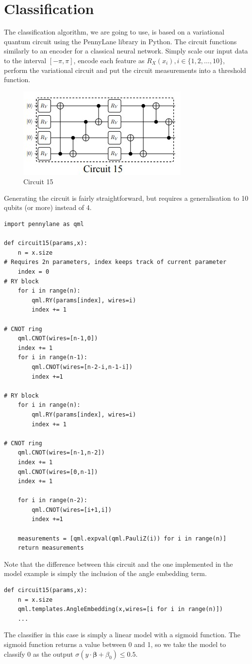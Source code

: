 \documentclass{article}
\theoremstyle{definition}
\begin{document}
\section{Classification}
The classification algorithm, we are going to use, is based on a variational quantum circuit using the PennyLane library \cite{bergholm2020pennylane} in Python. The circuit functions similarly to an encoder for a classical neural network. Simply scale our input data to the interval $[-\pi, \pi]$, encode each feature as $R_X(x_i), i \in \{1, 2, \ldots, 10\}$, perform the variational circuit and put the circuit measurements into a threshold function.

\begin{figure}[htb]
    \centering
    \includegraphics{Circuit15.jpg}
    \caption{Circuit 15 \cite{Sim_2019}}
    \label{fig:circuit15}
\end{figure}
Generating the circuit is fairly straightforward, but requires a generalisation to 10 qubits (or more) instead of 4.

\begin{verbatim}
import pennylane as qml

def circuit15(params,x):
    n = x.size
# Requires 2n parameters, index keeps track of current parameter
    index = 0
# RY block
    for i in range(n):
        qml.RY(params[index], wires=i)
        index += 1

# CNOT ring
    qml.CNOT(wires=[n-1,0])
    index += 1
    for i in range(n-1):
        qml.CNOT(wires=[n-2-i,n-1-i])
        index +=1        

# RY block
    for i in range(n):
        qml.RY(params[index], wires=i)
        index += 1
        
# CNOT ring
    qml.CNOT(wires=[n-1,n-2])
    index += 1
    qml.CNOT(wires=[0,n-1])
    index += 1
    
    for i in range(n-2):
        qml.CNOT(wires=[i+1,i])
        index +=1
    
    measurements = [qml.expval(qml.PauliZ(i)) for i in range(n)]
    return measurements
\end{verbatim}
Note that the difference between this circuit and the one implemented in the model example is simply the inclusion of the angle embedding term. 
\begin{verbatim}
def circuit15(params,x):
    n = x.size
    qml.templates.AngleEmbedding(x,wires=[i for i in range(n)]) 
    ...
\end{verbatim}
The classifier in this case is simply a linear model with a sigmoid function. The sigmoid function returns a value between 0 and 1, so we take the model to classify 0 as the output $\sigma(y \cdot \bm{\beta}  + \beta_0 ) \le 0.5$.
\end{document}
